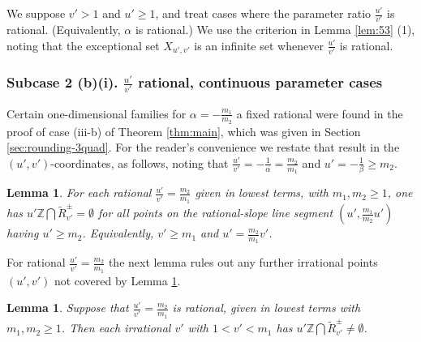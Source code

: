 \documentclass[12pt,letterpaper, reqno]{amsart}
\newtheorem{lem}[thm]{Lemma}
\theoremstyle{definition}
\theoremstyle{remark}
\newcommand{\ZZ}{\ensuremath{\mathbb{Z}}}
\newcommand{\uu}{{u'}}
\newcommand{\vv}{{v'}}
\begin{document}
We  suppose $\vv>1$ and  $\uu \ge 1$, and treat cases 
where the parameter  ratio $\frac{\uu}{\vv}$
 is rational. (Equivalently, $\alpha$ is rational.) 
 We use the  criterion in Lemma \ref{lem:53} (1), 
noting that the  exceptional set $X_{\uu,\vv}$   is an infinite set whenever $\frac{\uu}{\vv}$ is rational. 


\subsubsection{Subcase 2 (b)(i).  $\frac{\uu}{\vv}$ rational, continuous parameter cases}\label{sec:551}

Certain  one-dimensional families for $\alpha= -\frac{m_1}{m_2}$ a fixed rational
were found in the proof of case (iii-b) of Theorem \ref{thm:main}, which was given in Section \ref{sec:rounding-3quad}.
For the reader's convenience we  restate that result in the $(\uu, \vv)$-coordinates, as follows, noting that $\frac{\uu}{\vv}= -\frac{1}{\alpha}= \frac{m_2}{m_1} $
and ${\uu} = -\frac{1}{\beta} \geq  {m_2} $.

\begin{lem}\label{lem:59}
For each rational $\frac{\uu}{\vv}= \frac{m_2}{m_1}$  given in lowest terms, with $m_1, m_2 \ge 1$, 
one has  $\uu\ZZ \bigcap  \widetilde{R}_\vv^{\pm} = \emptyset$
for all points on the rational-slope line segment $(\uu,\frac{m_1}{m_2} \uu)$ having $ \uu \geq m_2$.
Equivalently,  $\vv \geq m_1$ and $\uu = \frac{m_2}{m_1}\vv$. 
\end{lem}



For  rational  $\frac{\uu}{\vv}= \frac{m_2}{m_1}$ the
next lemma rules out  any further  irrational points  $(\uu,\vv)$ not covered by
Lemma \ref{lem:59}.

\begin{lem}\label{lem:510}
Suppose 
that $\frac{\uu}{\vv} =  \frac{m_2}{m_1}$ is rational,  given in  lowest terms with $m_1, m_2 \ge 1$.
Then each  irrational $\vv$ with $1<\vv < {m_1}$
has $\uu\ZZ \bigcap  \widetilde{R}_\vv^{\pm} \ne \emptyset$.
\end{lem}
\end{document}
